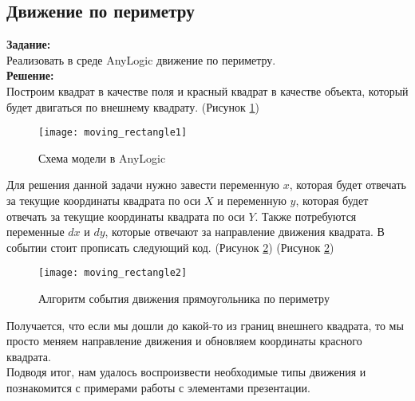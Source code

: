 \subsection*{Движение по периметру}

\textbf{Задание:}\\
Реализовать в среде AnyLogic движение по периметру.\\

\textbf{Решение:}\\
Построим квадрат в качестве поля и красный квадрат в качестве объекта, который будет двигаться по внешнему квадрату. (Рисунок \ref{fig:moving_rectangle1})
\begin{figure}[h]
	\centering \texttt{[image: moving\_rectangle1]}
	\caption{Схема модели в AnyLogic}
	\label{fig:moving_rectangle1}
\end{figure}

Для решения данной задачи нужно завести переменную $x$, которая будет отвечать за текущие координаты квадрата по оси $X$ и переменную $y$, которая будет отвечать за текущие координаты квадрата по оси $Y$. Также потребуются переменные $dx$ и $dy$, которые отвечают за направление движения квадрата. В событии стоит прописать следующий код. (Рисунок \ref{fig:moving_rectangle2})
(Рисунок \ref{fig:moving_rectangle2})
\begin{figure}[h]
	\centering \texttt{[image: moving\_rectangle2]}
	\caption{Алгоритм события движения прямоугольника по периметру}
	\label{fig:moving_rectangle2}
\end{figure}

Получается, что если мы дошли до какой-то из границ внешнего квадрата, то мы просто меняем направление движения и обновляем координаты красного квадрата.\\

Подводя итог, нам удалось воспроизвести необходимые типы движения и познакомится с примерами работы с элементами презентации.\\
